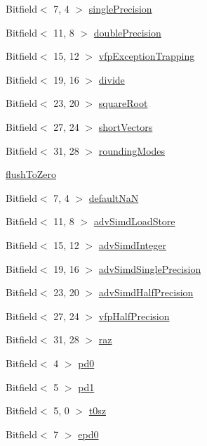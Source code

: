 \begin{DoxyCompactItemize}
Bitfield$<$ 7, 4 $>$ \hyperlink{namespaceArmISA_adbf73b15308967e154cb022d5ed10d0e}{singlePrecision}
\item 
Bitfield$<$ 11, 8 $>$ \hyperlink{namespaceArmISA_aa4c662457dec96929a7ddf28f2dc0904}{doublePrecision}
\item 
Bitfield$<$ 15, 12 $>$ \hyperlink{namespaceArmISA_ade2d3205226eabedb97cf506d5918053}{vfpExceptionTrapping}
\item 
Bitfield$<$ 19, 16 $>$ \hyperlink{namespaceArmISA_af07f32fbd74e90108a8f23c0c92f4961}{divide}
\item 
Bitfield$<$ 23, 20 $>$ \hyperlink{namespaceArmISA_a4a5fa5dcb3aed7244beafebdd5846016}{squareRoot}
\item 
Bitfield$<$ 27, 24 $>$ \hyperlink{namespaceArmISA_afc63d96d389ba05eb79edb30af238c23}{shortVectors}
\item 
Bitfield$<$ 31, 28 $>$ \hyperlink{namespaceArmISA_abdcb290b72bc12e9ef044212fdd68c07}{roundingModes}
\item 
\hyperlink{namespaceArmISA_a6b67ea0518bf0aea3cb2797f9051d358}{flushToZero}
\item 
Bitfield$<$ 7, 4 $>$ \hyperlink{namespaceArmISA_af62df0d81d085a81324db003312f4491}{defaultNaN}
\item 
Bitfield$<$ 11, 8 $>$ \hyperlink{namespaceArmISA_a1489194b5ced71f475ddcf2601f4c404}{advSimdLoadStore}
\item 
Bitfield$<$ 15, 12 $>$ \hyperlink{namespaceArmISA_af549573ac6027ed7e0a2e3636a144e45}{advSimdInteger}
\item 
Bitfield$<$ 19, 16 $>$ \hyperlink{namespaceArmISA_a65a025583d514054fe3aa4fdb0dc325e}{advSimdSinglePrecision}
\item 
Bitfield$<$ 23, 20 $>$ \hyperlink{namespaceArmISA_ae62a1fb1d2fbdf30977dbecf81b67952}{advSimdHalfPrecision}
\item 
Bitfield$<$ 27, 24 $>$ \hyperlink{namespaceArmISA_a2edc1b7878c66e53837062915c67528a}{vfpHalfPrecision}
\item 
Bitfield$<$ 31, 28 $>$ \hyperlink{namespaceArmISA_af9756af407f8868dd79de4e4b8b12798}{raz}
\item 
Bitfield$<$ 4 $>$ \hyperlink{namespaceArmISA_a8c1e9c6ad4eb5adbf1f3931413ed92c7}{pd0}
\item 
Bitfield$<$ 5 $>$ \hyperlink{namespaceArmISA_a105a730d0c950de6a6f8442586af9c9c}{pd1}
\item 
Bitfield$<$ 5, 0 $>$ \hyperlink{namespaceArmISA_a5d94e913d60bd21ebc33a9b3692d1adb}{t0sz}
\item 
Bitfield$<$ 7 $>$ \hyperlink{namespaceArmISA_a7570ba1c3225660814c88e8f3c0beb0e}{epd0}

\end{DoxyCompactItemize}
